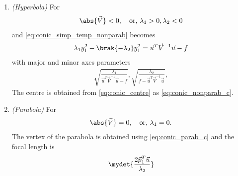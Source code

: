 \begin{enumerate}[label=\thesection.\arabic*.,ref=\thesection.\theenumi]
\item {\em (Hyperbola)} For \begin{align} \abs{\vec{V}} 
< 0, \quad \text{or, } \lambda_1 > 0, \lambda_2 < 0 \end{align} and \eqref{eq:conic_simp_temp_nonparab} becomes 
\begin{align} \lambda_1y_1^2 -\brak{-\lambda_2}y_1^2 = \vec{u}^T\vec{V}^{-1}\vec{u} -f \end{align} with major 
and minor axes parameters \begin{align} \sqrt{\frac{\lambda_1}{\vec{u}^T\vec{V}^{-1}\vec{u} -f}}, 
\sqrt{\frac{\lambda_2}{f-\vec{u}^T\vec{V}^{-1}\vec{u}}}, \end{align} The centre is obtained from 
\eqref{eq:conic_centre} as \eqref{eq:conic_nonparab_c}. 

\item {\em (Parabola)} For \begin{align} \abs{\vec{V}} 
= 0, \quad \text{or, } \lambda_1 = 0. \end{align}
The vertex of the parabola  is  obtained using \eqref{eq:conic_parab_c} and the focal length is 
\begin{align}
\mydet{\frac{2\vec{p}_1^T\vec{u}}{\lambda_2}}
\end{align}

\end{enumerate}
